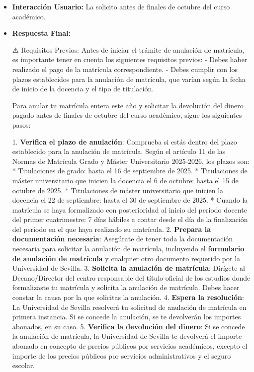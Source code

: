 \documentclass{article}
\begin{document}
\begin{itemize}
\begin{itemize}
                Recuerda que la anulación de matrícula puede tener consecuencias académicas y económicas, por lo que es importante leer detenidamente las Normas de Matrícula Grado y Máster Universitario 2025-2026 y consultar con la Universidad de Sevilla si tienes alguna duda.
          \item \textbf{Interacción Usuario:} La solicito antes de finales de octubre del curso académico.
          \item \textbf{Respuesta Final:}

                ⚠️ Requisitos Previos:
                Antes de iniciar el trámite de anulación de matrícula, es importante tener en cuenta los siguientes requisitos previos:
                - Debes haber realizado el pago de la matrícula correspondiente.
                - Debes cumplir con los plazos establecidos para la anulación de matrícula, que varían según la fecha de inicio de la docencia y el tipo de titulación.

                Para anular tu matrícula entera este año y solicitar la devolución del dinero pagado antes de finales de octubre del curso académico, sigue los siguientes pasos:

                1. \textbf{Verifica el plazo de anulación}: Comprueba si estás dentro del plazo establecido para la anulación de matrícula. Según el artículo 11 de las Normas de Matrícula Grado y Máster Universitario 2025-2026, los plazos son:
                * Titulaciones de grado: hasta el 16 de septiembre de 2025.
                * Titulaciones de máster universitario que inicien la docencia el 6 de octubre: hasta el 15 de octubre de 2025.
                * Titulaciones de máster universitario que inicien la docencia el 22 de septiembre: hasta el 30 de septiembre de 2025.
                * Cuando la matrícula se haya formalizado con posterioridad al inicio del periodo docente del primer cuatrimestre: 7 días hábiles a contar desde el día de la finalización del periodo en el que haya realizado su matrícula.
                2. \textbf{Prepara la documentación necesaria}: Asegúrate de tener toda la documentación necesaria para solicitar la anulación de matrícula, incluyendo el \textbf{formulario de anulación de matrícula} y cualquier otro documento requerido por la Universidad de Sevilla.
                3. \textbf{Solicita la anulación de matrícula}: Dirígete al Decano/Director del centro responsable del título oficial de los estudios donde formalizaste tu matrícula y solicita la anulación de matrícula. Debes hacer constar la causa por la que solicitas la anulación.
                4. \textbf{Espera la resolución}: La Universidad de Sevilla resolverá tu solicitud de anulación de matrícula en primera instancia. Si se concede la anulación, se te devolverán los importes abonados, en su caso.
                5. \textbf{Verifica la devolución del dinero}: Si se concede la anulación de matrícula, la Universidad de Sevilla te devolverá el importe abonado en concepto de precios públicos por servicios académicos, excepto el importe de los precios públicos por servicios administrativos y el seguro escolar.


\end{itemize}
\end{itemize}
\end{document}
